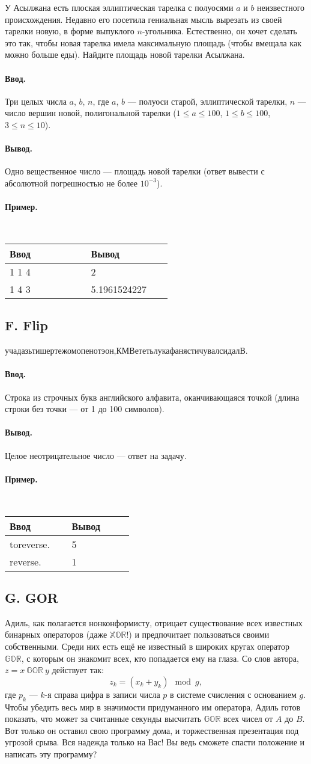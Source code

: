 \documentclass[12pt, a4paper]{article}
\newcommand{\informat}[1]
{
	\paragraph{Ввод.\\} #1
}
\newcommand{\outformat}[1]
{
	\paragraph{Вывод.\\} #1
}
\newcommand{\examplee}[4]
{
	\paragraph{Пример.\\}
	{\tt
	\begin{tabular}{|p{0.4\linewidth}|p{0.4\linewidth}|}
	\hline
	Ввод 	& Вывод  	\\
	\hline
	#1 		& #2 		\\
	\hline
	#3		& #4		\\
	\hline
	\end{tabular}
	}
}
\begin{document}
У Асылжана есть плоская эллиптическая тарелка с полуосями $a$ и $b$ неизвестного происхождения. Недавно его посетила гениальная мысль вырезать из своей тарелки новую, в форме выпуклого $n$-угольника. Естественно, он хочет сделать это так, чтобы новая тарелка имела максимальную площадь (чтобы вмещала как можно больше еды). Найдите площадь новой тарелки Асылжана.

\informat{Три целых числа $a$, $b$, $n$, где $a$, $b$ --- полуоси старой, эллиптической тарелки, $n$ --- число вершин новой, полигональной тарелки ($1 \le a \le 100$, $1 \le b \le 100$, $3 \le n \le 10$).}

\outformat{Одно вещественное число --- площадь новой тарелки (ответ вывести с абсолютной погрешностью не более $10^{-3}$).}

\examplee{1 1 4}{2}{1 4 3}{5.1961524227}



\subsection*{F. Flip}

учадазьтишертежомопенотэон,КМВететьлукафанястичувалсидалВ.

\informat{Строка из строчных букв английского алфавита, оканчивающаяся точкой (длина строки без точки --- от 1 до 100 символов).}

\outformat{Целое неотрицательное число --- ответ на задачу.}

\examplee{toreverse.}{5}{reverse.}{1}



\subsection*{G. GOR}

Адиль, как полагается нонконформисту, отрицает существование всех известных бинарных операторов (даже $\mathbb{XOR}$!) и предпочитает пользоваться своими собственными. Среди них есть ещё не известный в широких кругах оператор $\mathbb{GOR}$, с которым он знакомит всех, кто попадается ему на глаза. Со слов автора, $z = x \ \mathbb{GOR} \ y$ действует так:
$$z_k = (x_k + y_k) \mod g, $$ 
где $p_k$ --- $k$-я справа цифра в записи числа $p$ в системе счисления с основанием $g$. Чтобы убедить весь мир в значимости придуманного им оператора, Адиль готов показать, что может за считанные секунды высчитать $\mathbb{GOR}$ всех чисел от $A$ до $B$. Вот только он оставил свою программу дома, и торжественная презентация под угрозой срыва. Вся надежда только на Вас! Вы ведь сможете спасти положение и написать эту программу?
\end{document}
